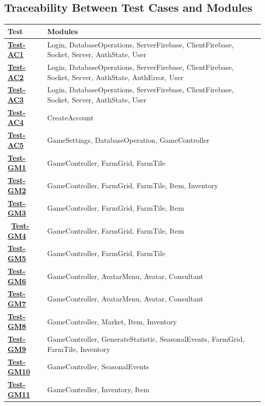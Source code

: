 \documentclass[12pt, titlepage]{article}
\begin{document}
\subsection{Traceability Between Test Cases and Modules}
\begin{table}[H]
\centering
\begin{tabular}{p{} p{}}
\toprule
\textbf{Test} & \textbf{Modules}\\
\midrule
\hyperref[Test-AC1]{\textbf{Test-AC1}} & Login, DatabaseOperations, ServerFirebase, ClientFirebase, Socket, Server, AuthState, User\\
\hyperref[Test-AC2]{\textbf{Test-AC2}} & Login, DatabaseOperations, ServerFirebase, ClientFirebase, Socket, Server, AuthState, AuthError, User\\
\hyperref[Test-AC3]{\textbf{Test-AC3}} & Login, DatabaseOperations, ServerFirebase, ClientFirebase, Socket, Server, AuthState, User\\
\hyperref[Test-AC4]{\textbf{Test-AC4}} & CreateAccount\\
\hyperref[Test-AC5]{\textbf{Test-AC5}} & GameSettings, DatabaseOperation, GameController\\
\hyperref[Test-GM1]{\textbf{Test-GM1}} & GameController, FarmGrid, FarmTile\\
\hyperref[Test-GM2]{\textbf{Test-GM2}} & GameController, FarmGrid, FarmTile, Item, Inventory\\
\hyperref[Test-GM3]{\textbf{Test-GM3}} & GameController, FarmGrid, FarmTile, Item\\\
\hyperref[Test-GM4]{\textbf{Test-GM4}} & GameController, FarmGrid, FarmTile, Item\\
\hyperref[Test-GM5]{\textbf{Test-GM5}} & GameController, FarmGrid, FarmTile\\
\hyperref[Test-GM6]{\textbf{Test-GM6}} & GameController, AvatarMenu, Avatar, Consultant\\
\hyperref[Test-GM7]{\textbf{Test-GM7}} & GameController, AvatarMenu, Avatar, Consultant\\
\hyperref[Test-GM8]{\textbf{Test-GM8}} & GameController, Market, Item, Inventory\\
\hyperref[Test-GM9]{\textbf{Test-GM9}} & GameController, GenerateStatistic, SeasonalEvents, FarmGrid, FarmTile, Inventory\\
\hyperref[Test-GM10]{\textbf{Test-GM10}} & GameController, SeasonalEvents\\
\hyperref[Test-GM11]{\textbf{Test-GM11}} & GameController, Inventory, Item\\

\end{tabular}
\end{table}
\end{document}

